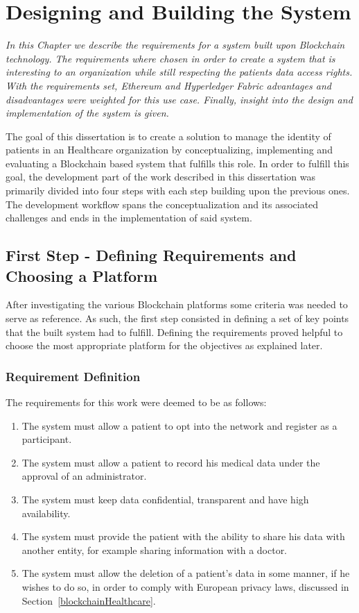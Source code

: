 \chapter{Designing and Building the System} \label{development}

\emph{In this Chapter we describe the requirements for a system built upon
Blockchain technology. The requirements where chosen in order to create a
system that is interesting to an organization while still respecting the
patients data access rights. With the requirements set, Ethereum and
Hyperledger Fabric advantages and disadvantages were weighted for this use
case. Finally, insight into the design and implementation of the system is
given.}

The goal of this dissertation is to create a solution to manage the identity of
patients in an Healthcare organization by conceptualizing, implementing and
evaluating a Blockchain based system that fulfills this role. In order to
fulfill this goal, the development part of the work described in this
dissertation was primarily divided into four steps with each step building upon
the previous ones. The development workflow spans the conceptualization and its
associated challenges and ends in the implementation of said system.

\section{First Step - Defining Requirements and Choosing a Platform}
\label{choosingHyperledger}

After investigating the various Blockchain platforms some criteria was needed
to serve as reference. As such, the first step consisted in defining a set of
key points that the built system had to fulfill. Defining the requirements
proved helpful to choose the most appropriate platform for the objectives as
explained later.

\subsection{Requirement Definition} 
The requirements for this work were deemed to be as follows:

\renewcommand{\labelenumi}{\Roman{enumi}.}
\begin{enumerate}
  \item The system must allow a patient to opt into the network and register as
    a participant.
  \item The system must allow a patient to record his medical data under the
    approval of an administrator.
  \item The system must keep data confidential, transparent and have
    high availability.
  \item The system must provide the patient with the ability to share his data with another entity, for example sharing
    information with a doctor.
  \item The system must allow the deletion of a patient's data in some manner,
    if he wishes to do so, in order to comply with European privacy laws,
    discussed in Section~\ref{blockchainHealthcare}.
\end{enumerate}

